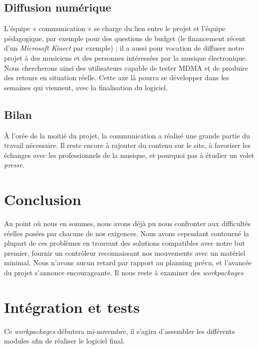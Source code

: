 \subsection{Diffusion numérique}
\par L'équipe « communication » se charge du lien entre le projet et l'équipe pédagogique, par exemple pour des questions de budget (le financement récent d'un \emph{Microsoft Kinect} par exemple) ; il a aussi pour vocation de diffuser notre projet à des musiciens et des personnes intéressées par la musique électronique. Nous chercherons ainsi des utilisateurs capable de tester MDMA et de produire des retours en situation réelle. Cette axe là pourra se développer dans les semaines qui viennent, avec la finalisation du logiciel.
\subsection{Bilan}
\par À l'orée de la moitié du projet, la communication a réalisé une grande partie du travail nécessaire. Il reste encore à rajouter du contenu sur le site, à favoriser les échanges avec les professionnels de la musique, et pourquoi pas à étudier un volet \emph{presse}.

\section{Conclusion}
Au point où nous en sommes, nous avons déjà pu nous confronter aux difficultés réelles posées par chacune de nos exigences. Nous avons cependant contourné la plupart de ces problèmes en trouvant des solutions compatibles avec notre but premier, fournir un contrôleur reconnaissant nos mouvements avec un matériel minimal. Nous n'avons aucun retard par rapport au planning prévu, et l'avancée du projet s'annonce encourageante. Il nous reste à examiner des \emph{workpackages}



\section{Intégration et tests}
Ce \emph{workpackages} débutera mi-novembre, il s'agira d'assembler les différents modules afin de réaliser le logiciel final.



